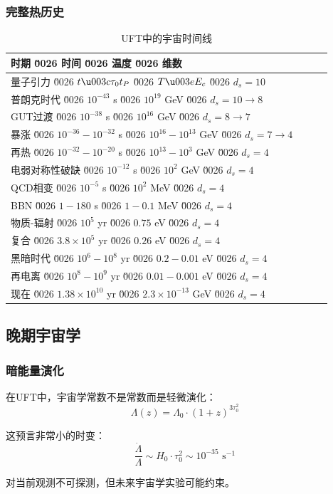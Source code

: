 \subsubsection{完整热历史}

\begin{table}[htbp]
\centering
\caption{UFT中的宇宙时间线}
\begin{tabular}{@{}llcc@{}}
\toprule
\textbf{时期} \u0026 \textbf{时间} \u0026 \textbf{温度} \u0026 \textbf{维数} \\
\midrule
量子引力 \u0026 $t \u003c \tau_0 t_P$ \u0026 $T \u003e E_c$ \u0026 $d_s = 10$ \\
普朗克时代 \u0026 $10^{-43}$ s \u0026 $10^{19}$ GeV \u0026 $d_s = 10 \to 8$ \\
GUT过渡 \u0026 $10^{-38}$ s \u0026 $10^{16}$ GeV \u0026 $d_s = 8 \to 7$ \\
暴涨 \u0026 $10^{-36} - 10^{-32}$ s \u0026 $10^{16} - 10^{13}$ GeV \u0026 $d_s = 7 \to 4$ \\
再热 \u0026 $10^{-32} - 10^{-20}$ s \u0026 $10^{13} - 10^{3}$ GeV \u0026 $d_s = 4$ \\
电弱对称性破缺 \u0026 $10^{-12}$ s \u0026 $10^{2}$ GeV \u0026 $d_s = 4$ \\
QCD相变 \u0026 $10^{-5}$ s \u0026 $10^{2}$ MeV \u0026 $d_s = 4$ \\
BBN \u0026 $1 - 180$ s \u0026 $1 - 0.1$ MeV \u0026 $d_s = 4$ \\
物质-辐射 \u0026 $10^{5}$ yr \u0026 $0.75$ eV \u0026 $d_s = 4$ \\
复合 \u0026 $3.8 \times 10^{5}$ yr \u0026 $0.26$ eV \u0026 $d_s = 4$ \\
黑暗时代 \u0026 $10^{6} - 10^{8}$ yr \u0026 $0.2 - 0.01$ eV \u0026 $d_s = 4$ \\
再电离 \u0026 $10^{8} - 10^{9}$ yr \u0026 $0.01 - 0.001$ eV \u0026 $d_s = 4$ \\
现在 \u0026 $1.38 \times 10^{10}$ yr \u0026 $2.3 \times 10^{-13}$ GeV \u0026 $d_s = 4$ \\
\bottomrule
\end{tabular}
\end{table}

\subsection{晚期宇宙学}

\subsubsection{暗能量演化}

在UFT中，宇宙学常数不是常数而是轻微演化：
\begin{equation}
    \Lambda(z) = \Lambda_0 \cdot (1 + z)^{3\tau_0^2}
\end{equation}

这预言非常小的时变：
\begin{equation}
    \frac{\dot{\Lambda}}{\Lambda} \sim H_0 \cdot \tau_0^2 \sim 10^{-35} \text{ s}^{-1}
\end{equation}

对当前观测不可探测，但未来宇宙学实验可能约束。
